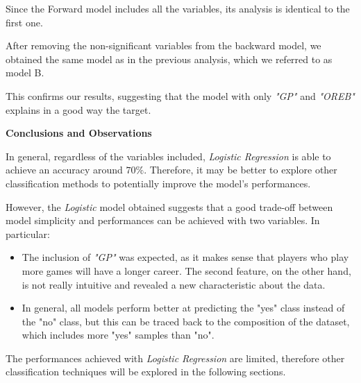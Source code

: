 Since the Forward model includes all the variables, its analysis is identical to the first one.

After removing the non-significant variables from the backward model, we obtained the same model as in the previous analysis, which we referred to as model B. 

This confirms our results, suggesting that the model with only \textit{"GP"} and \textit{"OREB"} explains in a good way the target. 

\vspace{0.2cm}
\textbf{Conclusions and Observations}

In general, regardless of the variables included, \textit{Logistic Regression} is able to achieve an accuracy around $70\%$. Therefore, it may be better to explore other classification methods to potentially improve the model's performances.

However, the \textit{Logistic} model obtained suggests that a good trade-off between model simplicity and performances can be achieved with two variables. In particular:

\begin{itemize}
	\item The inclusion of \textit{"GP"} was expected, as it makes sense that players who play more games will have a longer career. The second feature, on the other hand, is not really intuitive and revealed a new characteristic about the data.
	\item In general, all models perform better at predicting the "yes" class instead of the "no" class, but this can be traced back to the composition of the dataset, which includes more "yes" samples than "no".
\end{itemize}

The performances achieved with \textit{Logistic Regression} are limited, therefore other classification techniques will be explored in the following sections.

